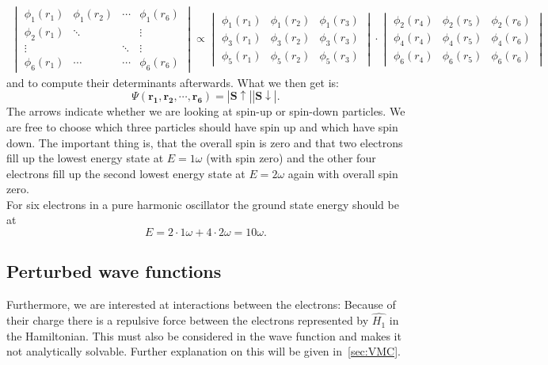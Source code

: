 \begin{align}
\begin{vmatrix}
\phi_1(r_1) & \phi_1(r_2) & \cdots & \phi_1(r_6)\\
\phi_2(r_1) & \ddots & &\vdots \\
\vdots & & \ddots& \vdots\\
\phi_6(r_1) & \cdots & \cdots & \phi_6(r_6)
\end{vmatrix}
\propto
\begin{vmatrix}
\phi_1(r_1)& \phi_1(r_2)& \phi_1(r_3)\\
\phi_3(r_1)& \phi_3(r_2)& \phi_3(r_3)\\
\phi_5(r_1)& \phi_5(r_2)& \phi_5(r_3)
\end{vmatrix}
\cdot
\begin{vmatrix}
\phi_2(r_4)& \phi_2(r_5)& \phi_2(r_6)\\
\phi_4(r_4)& \phi_4(r_5)& \phi_4(r_6)\\
\phi_6(r_4)& \phi_6(r_5)& \phi_6(r_6)
\end{vmatrix}
\end{align} 
and to compute their determinants afterwards. What we then get is:
\begin{equation}
\Psi(\mathbf{r_1,r_2,\cdots, r_6})= |\mathbf{S\uparrow}||\mathbf{S\downarrow}|.
\end{equation}
The arrows indicate whether we are looking at spin-up or spin-down particles. We are free to choose which three particles should have spin up and which have spin down. The important thing is, that the overall spin is zero and that two electrons fill up the lowest energy state at $E=1\omega$ (with spin zero) and the other four electrons fill up the second lowest energy state at $E=2\omega$ again with overall spin zero.\\
For six electrons in a pure harmonic oscillator the ground state energy should be at
\begin{equation}
E = 2 \cdot 1\omega + 4 \cdot 2\omega = 10\omega.
\end{equation}
\subsection{Perturbed wave functions}
Furthermore, we are interested at interactions between the electrons: Because of their charge there is a repulsive force between the electrons represented by $\hat{H_1}$ in the Hamiltonian. This must also be considered in the wave function and makes it not analytically solvable. Further explanation on this will be given in~\ref{sec:VMC}.